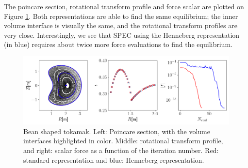 \documentclass[my_thesis.tex]{subfiles}
\begin{document}
The poincare section, rotational transform profile and force scalar are plotted on Figure \ref{fig. bean shape henneberg representation}. Both representations are able to find the same equilibrium; the inner volume interface is visually the same, and the rotational transform profiles are very close. Interestingly, we see that SPEC using the Henneberg representation (in blue) requires about twice more force evaluations to find the equilibrium.

\begin{figure}
	\centering
	\includegraphics[width=\linewidth]{images/HennebergRepresentation/BeanShape.png}
	\caption{Bean shaped tokamak. Left: Poincare section, with the volume interfaces highlighted in color. Middle: rotational transform profile, and right: scalar force as a function of the iteration number. Red: standard representation and blue: Henneberg representation.}
	\label{fig. bean shape henneberg representation}
\end{figure}
\end{document}
